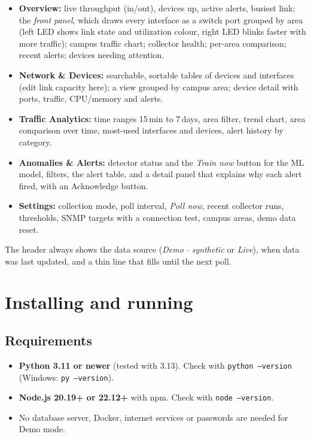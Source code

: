 \documentclass[11pt,a4paper]{article}
\newcommand{\code}[1]{\texttt{#1}}
\begin{document}
\begin{itemize}
  \item \textbf{Overview:} live throughput (in/out), devices up, active alerts, busiest link; the \emph{front panel}, which draws every
        interface as a switch port grouped by area (left LED shows link state and utilization colour, right LED blinks faster
        with more traffic); campus traffic chart; collector health; per-area comparison; recent alerts; devices needing attention.
  \item \textbf{Network \& Devices:} searchable, sortable tables of devices and interfaces (edit link capacity here); a view grouped
        by campus area; device detail with ports, traffic, CPU/memory and alerts.
  \item \textbf{Traffic Analytics:} time ranges 15\,min to 7\,days, area filter, trend chart, area comparison over time,
        most-used interfaces and devices, alert history by category.
  \item \textbf{Anomalies \& Alerts:} detector status and the \emph{Train now} button for the ML model, filters, the alert table,
        and a detail panel that explains why each alert fired, with an Acknowledge button.
  \item \textbf{Settings:} collection mode, poll interval, \emph{Poll now}, recent collector runs, thresholds, SNMP targets with a
        connection test, campus areas, demo data reset.
\end{itemize}

The header always shows the data source (\emph{Demo $\cdot$ synthetic} or \emph{Live}), when data was last updated, and a thin line
that fills until the next poll.

\section{Installing and running}

\subsection{Requirements}
\begin{itemize}
  \item \textbf{Python 3.11 or newer} (tested with 3.13). Check with \code{python --version} (Windows: \code{py --version}).
  \item \textbf{Node.js 20.19+ or 22.12+} with npm. Check with \code{node --version}.
  \item No database server, Docker, internet services or passwords are needed for Demo mode.
\end{itemize}
\end{document}
